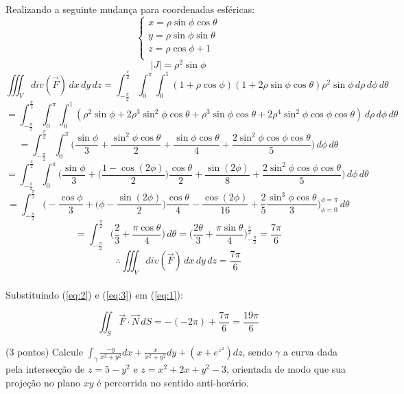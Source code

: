 \documentclass[12pt,a4paper]{article}
\begin{document}
Realizando a seguinte mudança para coordenadas esféricas:
\begin{equation}
\begin{cases}
x = \rho\sin\phi\cos\theta\\
y = \rho\sin\phi\sin\theta\\ 
z = \rho\cos\phi + 1\\
\end{cases}
\label{eq:mudanca}
\end{equation}
$$ |J| = \rho^2 \sin\phi $$
$$ \iiint_{V} div(\vec{F}) \,dx \,dy \,dz = \int_{-\frac{\pi}{2}}^{\frac{\pi}{2}} \int_{0}^{\pi} \int_{0}^{1} (1 + \rho\cos\phi)(1 + 2\rho\sin\phi\cos\theta)\rho^2 \sin\phi \,d\rho \,d\phi \,d\theta $$
$$ =  \int_{-\frac{\pi}{2}}^{\frac{\pi}{2}} \int_{0}^{\pi} \int_{0}^{1} ( \rho^2 \sin\phi + 2 \rho^3\sin^2\phi\cos\theta + \rho^3\sin\phi\cos\theta + 2\rho^4\sin^2\phi\cos\phi\cos\theta )  \,d\rho \,d\phi \,d\theta  $$
$$ =  \int_{-\frac{\pi}{2}}^{\frac{\pi}{2}} \int_{0}^{\pi} \Big(  \frac{\sin\phi}{3} +  \frac{\sin^2\phi\cos\theta}{2} + \frac{\sin\phi\cos\theta}{4} + \frac{2\sin^2\phi\cos\phi\cos\theta}{5} \Big) \,d\phi \,d\theta  $$
$$ =  \int_{-\frac{\pi}{2}}^{\frac{\pi}{2}} \int_{0}^{\pi} \Big(  \frac{\sin\phi}{3} +  \Big( \frac{1 - \cos(2\phi)}{2} \Big) \frac{\cos\theta}{2} + \frac{\sin(2\phi)}{8} + \frac{2\sin^2\phi\cos\phi\cos\theta}{5} \Big) \,d\phi \,d\theta  $$
$$ =  \int_{-\frac{\pi}{2}}^{\frac{\pi}{2}} \Big( - \frac{\cos\phi}{3} +  \Big( \phi - \frac{ \sin(2\phi)}{2} \Big) \frac{\cos\theta}{4} - \frac{\cos(2\phi)}{16} + \frac{2}{5} \frac{\sin^3\phi\cos\theta}{3} \Big)_{\phi=0}^{\phi=\pi}  \,d\theta $$
$$ =  \int_{-\frac{\pi}{2}}^{\frac{\pi}{2}} \Big(  \frac{2}{3} +  \frac{\pi\cos\theta}{4}  \Big) \,d\theta =  \Big(  \frac{2\theta}{3} +  \frac{\pi\sin\theta}{4}  \Big)_{-\frac{\pi}{2}}^{\frac{\pi}{2}} = \frac{7\pi}{6} $$
\begin{equation}
\therefore \iiint_{V} div(\vec{F}) \,dx \,dy \,dz = \frac{7\pi}{6}
\label{eq:3}
\end{equation} \\

Substituindo (\ref{eq:2}) e (\ref{eq:3}) em (\ref{eq:1}):

$$ \iint_{S} \vec{F} \cdot \vec{N} \,dS = -(-2\pi) + \frac{7\pi}{6} = \frac{19\pi}{6}  $$
 
\newpage

 (3 pontos) Calcule $\displaystyle\int_{\gamma} \frac{-y}{x^2 + y^2}dx + \frac{x}{x^2 + y^2}dy + (x + e^{z^2})dz$, sendo $\gamma$ a curva dada pela intersecção de $z = 5 - y^2$ e $z = x^2 + 2x + y^2 -3$, orientada de modo que sua projeção no plano $xy$ é percorrida no sentido anti-horário.
\end{document}
